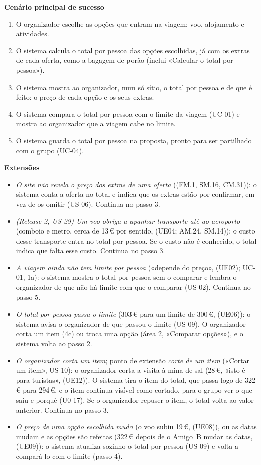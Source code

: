 \documentclass[11pt,a4paper]{article}
\newcommand{\reg}[1]{{\footnotesize\textcolor{pendente}{(#1)}}}
\newenvironment{usecase}[2]{%
  \par\medskip\noindent{\large\bfseries\color{roamly}#1: #2}\par\smallskip\small\noindent\ignorespaces}{\par\medskip}
\begin{document}
\begin{usecase}{UC-02}{Saber o total real por pessoa}
\textbf{Cenário principal de sucesso}
\begin{enumerate}
  \item O organizador escolhe as opções que entram na viagem: voo, alojamento e atividades.
  \item O sistema calcula o total por pessoa das opções escolhidas, já com os extras de cada oferta, como a bagagem de porão (inclui «Calcular o total por pessoa»).
  \item O sistema mostra ao organizador, num só sítio, o total por pessoa e de que é feito: o preço de cada opção e os seus extras.
  \item O sistema compara o total por pessoa com o limite da viagem (UC-01) e mostra ao organizador que a viagem cabe no limite.
  \item O sistema guarda o total por pessoa na proposta, pronto para ser partilhado com o grupo (UC-04).
\end{enumerate}

\textbf{Extensões}
\begin{itemize}[leftmargin=2.2em]
  \item[2a.] \textit{O site não revela o preço dos extras de uma oferta} (\reg{FM.1, SM.16, CM.31}): o sistema conta a oferta no total e indica que os extras estão por confirmar, em vez de os omitir (US-06). Continua no passo 3.
  \item[2b.] \textit{(Release 2, US-29) Um voo obriga a apanhar transporte até ao aeroporto} (comboio e metro, cerca de 13\,€ por sentido, \reg{UE04; AM.24, SM.14}): o custo desse transporte entra no total por pessoa. Se o custo não é conhecido, o total indica que falta esse custo. Continua no passo 3.
  \item[4a.] \textit{A viagem ainda não tem limite por pessoa} («depende do preço», \reg{UE02}; UC-01, 1a): o sistema mostra o total por pessoa sem o comparar e lembra o organizador de que não há limite com que o comparar (US-02). Continua no passo 5.
  \item[4b.] \textit{O total por pessoa passa o limite} (303\,€ para um limite de 300\,€, \reg{UE06}): o sistema avisa o organizador de que passou o limite (US-09). O organizador corta um item (4c) ou troca uma opção (área 2, «Comparar opções»), e o sistema volta ao passo 2.
  \item[4c.] \textit{O organizador corta um item}; ponto de extensão \textit{corte de um item} («Cortar um item», US-10): o organizador corta a visita à mina de sal (28\,€, «isto é para turistas», \reg{UE12}). O sistema tira o item do total, que passa logo de 322\,€ para 294\,€, e o item continua visível como cortado, para o grupo ver o que saiu e porquê \reg{U0-17}. Se o organizador repuser o item, o total volta ao valor anterior. Continua no passo 3.
  \item[*a.] \textit{O preço de uma opção escolhida muda} (o voo subiu 19\,€, \reg{UE08}), ou as datas mudam e as opções são refeitas (322\,€ depois de o Amigo~B mudar as datas, \reg{UE09}): o sistema atualiza sozinho o total por pessoa (US-09) e volta a compará-lo com o limite (passo 4).
\end{itemize}


\end{usecase}
\end{document}
